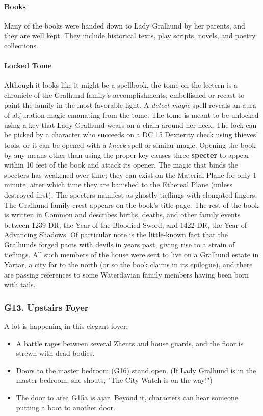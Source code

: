 \documentclass[10pt,a4paper,twoside,twocolumn,openany,nodeprecatedcode]{dndbook}
\begin{document}
\paragraph{Books}
Many of the books were handed down to Lady Gralhund by her parents, and they are well kept. They include historical texts, play scripts, novels, and poetry collections.
\paragraph{Locked Tome}
Although it looks like it might be a spellbook, the tome on the lectern is a chronicle of the Gralhund family's accomplishments, embellished or recast to paint the family in the most favorable light. A \textit{detect magic} spell reveals an aura of abjuration magic emanating from the tome.
The tome is meant to be unlocked using a key that Lady Gralhund wears on a chain around her neck. The lock can be picked by a character who succeeds on a DC 15 Dexterity check using thieves' tools, or it can be opened with a \textit{knock} spell or similar magic. Opening the book by any means other than using the proper key causes three \textbf{specter} to appear within 10 feet of the book and attack its opener. The magic that binds the specters has weakened over time; they can exist on the Material Plane for only 1 minute, after which time they are banished to the Ethereal Plane (unless destroyed first). The specters manifest as ghostly tieflings with elongated fingers.
The Gralhund family crest appears on the book's title page. The rest of the book is written in Common and describes births, deaths, and other family events between 1239 DR, the Year of the Bloodied Sword, and 1422 DR, the Year of Advancing Shadows. Of particular note is the little-known fact that the Gralhunds forged pacts with devils in years past, giving rise to a strain of tieflings. All such members of the house were sent to live on a Gralhund estate in Yartar, a city far to the north (or so the book claims in its epilogue), and there are passing references to some Waterdavian family members having been born with tails.
\subsubsection{G13. Upstairs Foyer}
A lot is happening in this elegant foyer:
\begin{itemize}

\item A battle rages between several Zhents and house guards, and the floor is strewn with dead bodies.
\item Doors to the master bedroom (G16) stand open. (If Lady Gralhund is in the master bedroom, she shouts, "The City Watch is on the way!")
\item The door to area G15a is ajar. Beyond it, characters can hear someone putting a boot to another door.
\end{itemize}
\end{document}
